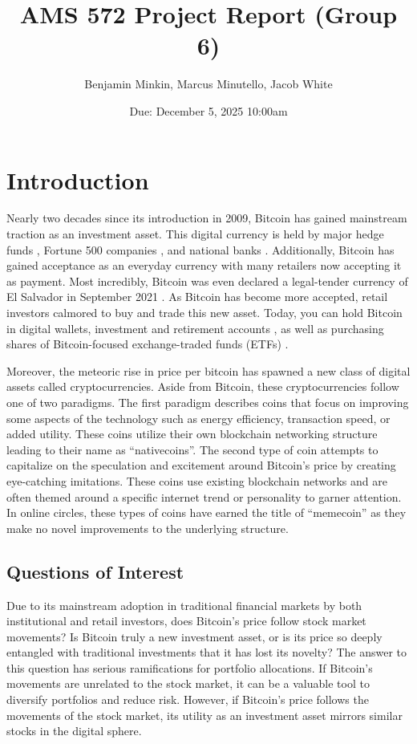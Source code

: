 \documentclass[12pt]{article}
\title{\textbf{AMS 572 Project Report (Group 6)}}
\author{Benjamin Minkin, Marcus Minutello, Jacob White}
\date{Due: December 5, 2025 \@ 10:00am}
\begin{document}
 
	\maketitle
	\newpage 
	\tableofcontents
	\newpage 
	\section{Introduction}
	Nearly two decades since its introduction in 2009, Bitcoin has gained mainstream traction as an
	investment asset. This digital currency is held by major hedge  funds \cite{reuters2025hedge}, Fortune 500 companies \cite{wsj2021tesla},
	and national banks \cite{elpais2023elsalvador}. Additionally, Bitcoin has gained acceptance as an everyday currency with many
	retailers now accepting it as payment. Most incredibly, Bitcoin was even declared a legal-tender currency
	of El Salvador in September 2021 \cite{elysium_companies}. As Bitcoin has become more accepted, retail investors calmored to buy 
	and trade this new asset. Today, you can hold Bitcoin in digital wallets, investment and retirement accounts \cite{fidelity_crypto_ira},
	as well as purchasing shares of Bitcoin-focused exchange-traded funds (ETFs) \cite{wsj2021etf}.
	
	Moreover, the meteoric rise in price per bitcoin has spawned a new class of digital assets called cryptocurrencies. 
	Aside from Bitcoin, these cryptocurrencies follow one of two paradigms. The first paradigm describes coins that focus 
	on improving some aspects of the technology such as energy efficiency, transaction speed, or added utility. These coins 
	utilize their own blockchain networking structure leading to their name as “nativecoins”. The second type of coin attempts 
	to capitalize on the speculation and excitement around Bitcoin’s price by creating eye-catching imitations. These coins use
	existing blockchain networks and are often themed around a specific internet trend or personality to garner attention. In 
	online circles, these types of coins have earned the title of “memecoin” as they make no novel improvements to the 
	underlying structure.  

	\subsection{Questions of Interest}
		
	Due to its mainstream adoption in traditional financial markets by both institutional and retail investors, does Bitcoin’s 
	price follow stock market movements? Is Bitcoin truly a new investment asset, or is its price so deeply entangled with 
	traditional investments that it has lost its novelty? The answer to this question has serious ramifications for portfolio 
	allocations. If Bitcoin’s movements are unrelated to the stock market, it can be a valuable tool to diversify portfolios 
	and reduce risk. However, if Bitcoin’s price follows the movements of the stock market, its utility as an investment asset 
	mirrors similar stocks in the digital sphere. 
	
\end{document}
